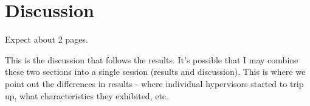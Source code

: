 \section{Discussion}
Expect about 2 pages.


This is the discussion that follows the results.  It's possible that I may
combine these two sections into a single session (results and discussion). This
is where we point out the differences in results - where individual hypervisors
started to trip up, what characteristics they exhibited, etc.

